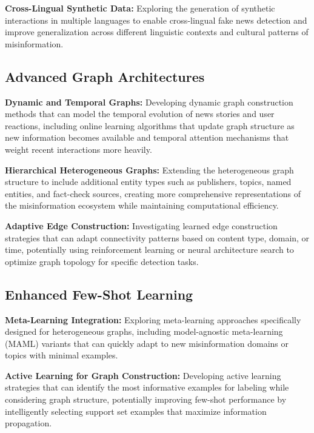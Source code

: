 \textbf{Cross-Lingual Synthetic Data:} Exploring the generation of synthetic interactions in multiple languages to enable cross-lingual fake news detection and improve generalization across different linguistic contexts and cultural patterns of misinformation.

\subsection{Advanced Graph Architectures}

\textbf{Dynamic and Temporal Graphs:} Developing dynamic graph construction methods that can model the temporal evolution of news stories and user reactions, including online learning algorithms that update graph structure as new information becomes available and temporal attention mechanisms that weight recent interactions more heavily.

\textbf{Hierarchical Heterogeneous Graphs:} Extending the heterogeneous graph structure to include additional entity types such as publishers, topics, named entities, and fact-check sources, creating more comprehensive representations of the misinformation ecosystem while maintaining computational efficiency.


\textbf{Adaptive Edge Construction:} Investigating learned edge construction strategies that can adapt connectivity patterns based on content type, domain, or time, potentially using reinforcement learning or neural architecture search to optimize graph topology for specific detection tasks.

\subsection{Enhanced Few-Shot Learning}

\textbf{Meta-Learning Integration:} Exploring meta-learning approaches specifically designed for heterogeneous graphs, including model-agnostic meta-learning (MAML) variants that can quickly adapt to new misinformation domains or topics with minimal examples.

\textbf{Active Learning for Graph Construction:} Developing active learning strategies that can identify the most informative examples for labeling while considering graph structure, potentially improving few-shot performance by intelligently selecting support set examples that maximize information propagation.

